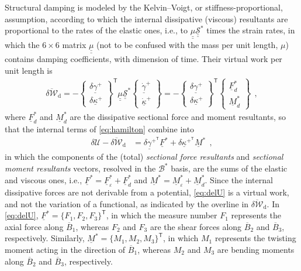 \documentclass[12pt,a4paper,oneside,english]{abntex2} %
\newcommand{\fix}[1]{{\color{red}#1}}
\newcommand{\vect}[1]{\underline{#1}}
\newcommand{\uvec}[1]{\overline{#1}}
\def\tens#1{\underline{\underline{#1}}}
\def\T{\mathsf{T}}
\def\B*{\mathcal{B}^*}
\def\gam{\vect{\gamma}}
\def\gamp{\gam^{+}}
\def\gampT{\gam^{+^\T}}
\def\gampdot{\dot{\gam}^{+}}
\def\kap{\vect{\kappa}}
\def\kapp{\kap^{+}}
\def\kappT{\kap^{+^\T}}
\def\kappdot{\dot{\kap}^{+}}
\def\F{\vect{F}}
\def\Fs{\F^*}
\def\M{\vect{M}}
\def\Ms{\M^*}
\def\Stiff{\mathcal{\tens{S}}^*}
\def\Fseps{\F^*_{\varepsilon}}
\def\Mseps{\M^*_{\varepsilon}}
\def\Fsd{\Fs_d}
\def\Msd{\Ms_d}
\def\deltaWd{\overline{\delta\mathcal{W}}_{\text{d}}}
\begin{document}
\fix{Structural damping is modeled by the Kelvin--Voigt, or stiffness-proportional, assumption, according to which the internal dissipative (viscous) resultants are proportional to the rates of the elastic ones, i.e., to $\tens{\mu}\Stiff$ times the strain rates, in which the $6\times6$ matrix $\tens{\mu}$ (not to be confused with the mass per unit length, $\mu$) contains damping coefficients, with dimension of time. Their virtual work per unit length is
\begin{align}
    \deltaWd = -
    \begin{Bmatrix}
    \delta\gamp \\ \delta\kapp
    \end{Bmatrix}^\T
    \tens{\mu}\Stiff
    \begin{Bmatrix}
    \gampdot \\ \kappdot
    \end{Bmatrix}
    =  -
    \begin{Bmatrix}
    \delta\gamp \\ \delta\kapp
    \end{Bmatrix}^\T 
    \begin{Bmatrix}
    \Fsd \\ \Msd
    \end{Bmatrix}\ \ ,
    \label{eq:deltaWd}
\end{align}
where $\Fsd$ and $\Msd$ are the dissipative sectional force and moment resultants, so that the internal terms of \cref{eq:hamilton} combine into
\begin{align}
    \delta\mathcal{U} - \deltaWd &= \delta\gampT\Fs + \delta\kappT\Ms \ \ ,
    \label{eq:delU}
\end{align}
in which the components of the (total) \textit{sectional force resultants} and \textit{sectional moment resultants} vectors, resolved in the $\B*$ basis, are the sums of the elastic and viscous ones, i.e., $\Fs = \Fseps + \Fsd$ and $\Ms = \Mseps + \Msd$. Since the internal dissipative forces are not derivable from a potential, \cref{eq:delU} is a virtual work, and not the variation of a functional, as indicated by the overline in $\deltaWd$.} In \fix{\cref{eq:delU}}, $\Fs = \{F_1,F_2,F_3\}^\T$, in which the measure number $F_1$ represents the axial force along $\uvec{B}_1$, whereas $F_2$ and $F_3$ are the shear forces along $\uvec{B}_2$ and $\uvec{B}_3$, respectively. Similarly, $\Ms = \{M_1,M_2,M_3\}^\T$, in which $M_1$ represents the twisting moment acting in the direction of $\uvec{B}_1$, whereas $M_2$ and $M_3$ are bending moments along $\uvec{B}_2$ and $\uvec{B}_3$, respectively. 
\end{document}
